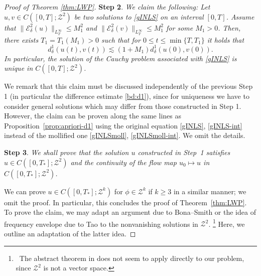 \documentclass{amsart}
\numberwithin{equation}{section}
\begin{document}
\begin{proof}[Proof of Theorem \ref{thm:LWP}]
\bigskip
\noindent
{\bf Step 2}.
{\it We claim the following: 
Let $u,v\in C([0,T];\mathcal{Z}^2)$ be two solutions to \eqref{gINLS} on an interval $[0,T]$. 
Assume that $\| \mathcal{E}^2_\delta(u)\|_{L^\infty_T}\leq M_1^2$ and $\| \mathcal{E}^2_\delta(v)\|_{L^\infty_T}\leq M_1^2$ for some $M_1>0$.
Then, there exists $T_1=T_1(M_1)>0$ such that for $0\leq t\leq \min \{ T,T_1\}$ it holds that
\begin{equation*}
d^1_\delta(u(t),v(t))\lesssim (1+M_1)d^1_\delta(u(0),v(0)).
\end{equation*}
In particular, the solution of the Cauchy problem associated with \eqref{gINLS} is unique in $C([0,T];\mathcal{Z}^2)$.}

\medskip
We remark that this claim must be discussed independently of the previous Step 1 (in particular the difference estimate \eqref{bd:d1}), since for uniqueness we have to consider general solutions which may differ from those constructed in Step 1.
However, the claim can be proven along the same lines as Proposition~\ref{prop:apriori-d1} using the original equation \eqref{gINLS}, \eqref{gINLS-int} instead of the mollified one \eqref{gINLSmoll}, \eqref{gINLSmoll-int}.
We omit the details.


\bigskip
\noindent
{\bf Step 3}.
{\it We shall prove that the solution $u$ constructed in Step~1 satisfies $u \in C([0,T_*];\mathcal{Z}^2)$ and the continuity of the flow map $u_0\mapsto u$ in $C([0,T_*];\mathcal{Z}^2)$.}

\medskip
We can prove $u\in C([0,T_*];\mathcal{Z}^k)$ for $\phi\in \mathcal{Z}^k$ if $k\geq 3$ in a similar manner; we omit the proof.
In particular, this concludes the proof of Theorem~\ref{thm:LWP}.
To prove the claim, we may adapt an argument due to Bona--Smith \cite{Bona-Smith} or the idea of frequency envelope due to Tao \cite{Tao-2001, Ifrim-Tataru, Burq} to the nonvanishing solutions in $\mathcal{Z}^2$.%
\footnote{~The abstract theorem in \cite{Burq} does not seem to apply directly to our problem, since $\mathcal{Z}^2$ is not a vector space.}
Here, we outline an adaptation of the latter idea.


\end{proof}
\end{document}
